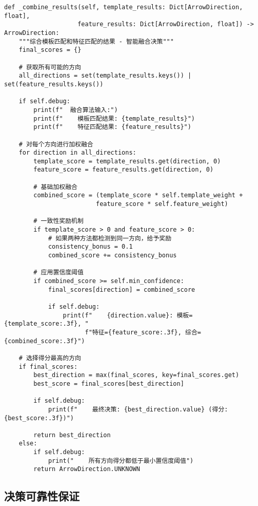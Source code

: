 \documentclass[12pt]{article}
\begin{document}
\begin{lstlisting}[caption=智能结果融合算法]
def _combine_results(self, template_results: Dict[ArrowDirection, float], 
                    feature_results: Dict[ArrowDirection, float]) -> ArrowDirection:
    """综合模板匹配和特征匹配的结果 - 智能融合决策"""
    final_scores = {}
    
    # 获取所有可能的方向
    all_directions = set(template_results.keys()) | set(feature_results.keys())
    
    if self.debug:
        print(f"  融合算法输入:")
        print(f"    模板匹配结果: {template_results}")
        print(f"    特征匹配结果: {feature_results}")
    
    # 对每个方向进行加权融合
    for direction in all_directions:
        template_score = template_results.get(direction, 0)
        feature_score = feature_results.get(direction, 0)
        
        # 基础加权融合
        combined_score = (template_score * self.template_weight + 
                         feature_score * self.feature_weight)
        
        # 一致性奖励机制
        if template_score > 0 and feature_score > 0:
            # 如果两种方法都检测到同一方向，给予奖励
            consistency_bonus = 0.1
            combined_score += consistency_bonus
            
        # 应用置信度阈值
        if combined_score >= self.min_confidence:
            final_scores[direction] = combined_score
            
            if self.debug:
                print(f"    {direction.value}: 模板={template_score:.3f}, "
                      f"特征={feature_score:.3f}, 综合={combined_score:.3f}")
    
    # 选择得分最高的方向
    if final_scores:
        best_direction = max(final_scores, key=final_scores.get)
        best_score = final_scores[best_direction]
        
        if self.debug:
            print(f"    最终决策: {best_direction.value} (得分: {best_score:.3f})")
            
        return best_direction
    else:
        if self.debug:
            print("    所有方向得分都低于最小置信度阈值")
        return ArrowDirection.UNKNOWN
\end{lstlisting}

\subsection{决策可靠性保证}
\end{document}
